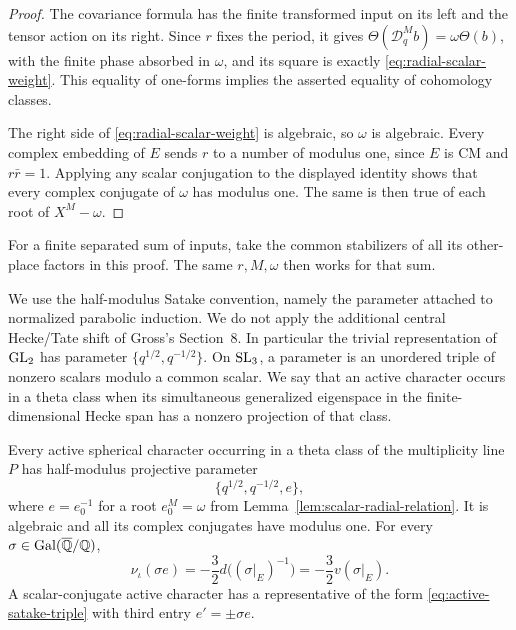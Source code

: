 \begin{proof}
The covariance formula has the finite transformed input on its
left and the tensor action on its right.  Since \(r\) fixes the
period, it gives
\(\Theta(\mathcal D_q^M b)=\omega\Theta(b)\), with the finite
phase absorbed in \(\omega\), and its square is exactly
\eqref{eq:radial-scalar-weight}.  This equality of one-forms
implies the asserted equality of cohomology classes.

The right side of \eqref{eq:radial-scalar-weight} is algebraic,
so \(\omega\) is algebraic.  Every complex embedding of \(E\)
sends \(r\) to a number of modulus one, since \(E\) is CM and
\(r\bar r=1\).  Applying any scalar conjugation to the displayed
identity shows that every complex conjugate of \(\omega\) has
modulus one.  The same is then true of each root of \(X^M-\omega\).
\end{proof}

For a finite separated sum of inputs, take the common stabilizers
of all its other-place factors in this proof.  The same \(r,M,\omega\)
then works for that sum.

We use the half-modulus Satake convention, namely the parameter
attached to normalized parabolic induction.  We do not apply the
additional central Hecke/Tate shift of Gross's Section~8.  In particular the
trivial representation of \(\operatorname{GL}_2\) has parameter
\(\{q^{1/2},q^{-1/2}\}\).  On \(\operatorname{SL}_3\), a parameter is an unordered
triple of nonzero scalars modulo a common scalar.
We say that an active character occurs in a theta class when its
simultaneous generalized eigenspace in the finite-dimensional
Hecke span has a nonzero projection of that class.

\begin{proposition}\label{prop:theta-satake}
Every active spherical character occurring in a theta class of
the multiplicity line \(P\) has half-modulus projective parameter
\begin{equation}\label{eq:active-satake-triple}
\{q^{1/2},q^{-1/2},e\},
\end{equation}
where \(e=e_0^{-1}\) for a root \(e_0^M=\omega\) from
Lemma~\ref{lem:scalar-radial-relation}.  It is algebraic and all
its complex conjugates have modulus one.  For every
\(\sigma\in\operatorname{Gal}(\overline{\mathbb{Q}}/\mathbb{Q})\),
\begin{equation}\label{eq:active-conjugate-valuations}
\nu_\iota(\sigma e)
 =-\frac32d\bigl((\sigma|_E)^{-1}\bigr)
 =-\frac32v(\sigma|_E).
\end{equation}
A scalar-conjugate active character has a representative of the
form \eqref{eq:active-satake-triple} with third entry
\(e'=\pm\sigma e\).
\end{proposition}

